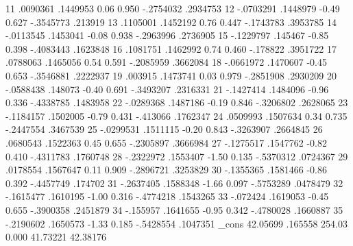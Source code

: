          11  {\VBAR}   .0090361   .1449953     0.06   0.950    -.2754032    .2934753
         12  {\VBAR}  -.0703291   .1448979    -0.49   0.627    -.3545773     .213919
         13  {\VBAR}   .1105001   .1452192     0.76   0.447    -.1743783    .3953785
         14  {\VBAR}  -.0113545   .1453041    -0.08   0.938    -.2963996    .2736905
         15  {\VBAR}  -.1229797    .145467    -0.85   0.398    -.4083443    .1623848
         16  {\VBAR}   .1081751   .1462992     0.74   0.460     -.178822    .3951722
         17  {\VBAR}   .0788063   .1465056     0.54   0.591    -.2085959    .3662084
         18  {\VBAR}  -.0661972   .1470607    -0.45   0.653    -.3546881    .2222937
         19  {\VBAR}    .003915   .1473741     0.03   0.979    -.2851908    .2930209
         20  {\VBAR}  -.0588438    .148073    -0.40   0.691    -.3493207    .2316331
         21  {\VBAR}  -.1427414   .1484096    -0.96   0.336    -.4338785    .1483958
         22  {\VBAR}  -.0289368   .1487186    -0.19   0.846    -.3206802    .2628065
         23  {\VBAR}  -.1184157   .1502005    -0.79   0.431     -.413066    .1762347
         24  {\VBAR}   .0509993   .1507634     0.34   0.735    -.2447554    .3467539
         25  {\VBAR}  -.0299531   .1511115    -0.20   0.843    -.3263907    .2664845
         26  {\VBAR}   .0680543   .1522363     0.45   0.655    -.2305897    .3666984
         27  {\VBAR}  -.1275517   .1547762    -0.82   0.410    -.4311783    .1760748
         28  {\VBAR}  -.2322972   .1553407    -1.50   0.135    -.5370312    .0724367
         29  {\VBAR}   .0178554   .1567647     0.11   0.909    -.2896721    .3253829
         30  {\VBAR}  -.1355365   .1581466    -0.86   0.392    -.4457749     .174702
         31  {\VBAR}  -.2637405   .1588348    -1.66   0.097    -.5753289    .0478479
         32  {\VBAR}  -.1615477   .1610195    -1.00   0.316    -.4774218    .1543265
         33  {\VBAR}   -.072424   .1619053    -0.45   0.655    -.3900358    .2451879
         34  {\VBAR}   -.155957   .1641655    -0.95   0.342    -.4780028    .1660887
         35  {\VBAR}  -.2190602   .1650573    -1.33   0.185    -.5428554    .1047351
             {\VBAR}
       _cons {\VBAR}   42.05699    .165558   254.03   0.000     41.73221    42.38176
